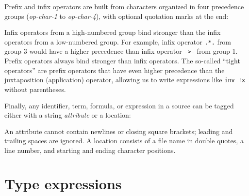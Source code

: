 Prefix and infix operators are built from characters organized in four
precedence groups (\textsl{op-char-1} to \textsl{op-char-4}), with
optional quotation marks at the end:
\begin{center}\end{center}
Infix operators from a high-numbered group bind stronger
than the infix operators from a low-numbered group.
For example, infix operator \texttt{.*.} from group 3
would have a higher precedence than infix operator
\texttt{->-} from group 1.
Prefix operators always bind stronger than infix operators.
The so-called ``tight operators'' are prefix operators that have even
higher precedence than the juxtaposition (application) operator,
allowing us to write expressions like \texttt{inv !x}
without parentheses.


Finally, any identifier, term, formula, or expression
in a \whyml source can be tagged either with a string
\textit{attribute} or a location:
\begin{center}\end{center}
An attribute cannot contain newlines or closing square brackets;
leading and trailing spaces are ignored.
A location consists of a file name in double quotes,
a line number, and starting and ending character positions.

\section{Type expressions}
\label{sec:types}

